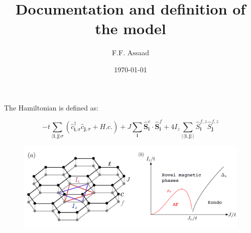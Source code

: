 \documentclass[aps,prx,twocolumn,superscriptaddress,showpacs]{revtex4-1}
\begin{document}
\title{ Documentation and definition of the model  }

\author{ F.F. Assaad}

\date{\today}

\begin{abstract}

\end{abstract}


\maketitle

The Hamiltonian is defined as: 
\begin{widetext}
\begin{equation}
	-t \sum_{ \langle \pmb{i},\pmb{j} \rangle  \sigma}   \left( \hat{c}^{\dagger}_{\pmb{i},\sigma} \hat{c}_{\pmb{j}, \sigma} + H.c. \right)  +
	  J \sum_{\pmb{i}} \hat{\pmb{S}}^{c}_{\pmb{i}} \cdot \hat{\pmb{S}}^{f}_{\pmb{i}}  +  
	  4  I_z  \sum_{ \langle \langle \pmb{i},\pmb{j} \rangle \rangle  }  \hat{S}^{f,z}_{\pmb{i}}   \hat{S}^{f,z}_{\pmb{j} }
 \end{equation}

\begin{figure}[h]
\includegraphics[width=0.99\linewidth]{Kondo1.pdf}
\end{figure}
\end{widetext}
\end{document}
